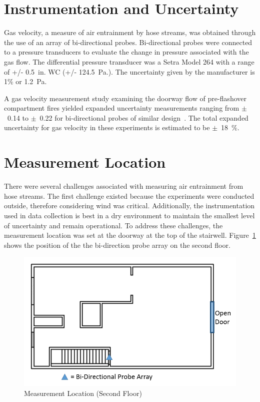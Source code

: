 \documentclass[12pt,oneside]{book}
\begin{document}
\section{Instrumentation and Uncertainty}
\label{sec:uncert}
Gas velocity, a measure of air entrainment by hose streams, was obtained through the use of an array of bi-directional probes. Bi-directional probes were connected to a pressure transducers to evaluate the change in pressure associated with the gas flow. The differential pressure transducer was a Setra Model 264 with a range of +/- 0.5~in. WC (+/- 124.5~Pa.). The uncertainty given by the manufacturer is 1\% or 1.2~Pa. 

A gas velocity measurement study examining the doorway flow of pre-flashover compartment fires yielded expanded uncertainty measurements ranging from $\pm$~0.14 to $\pm$~0.22 for bi-directional probes of similar design~\cite{Bryant:FSJ2009}. The total expanded uncertainty for gas velocity in these experiments is estimated to be $\pm$~18~\%.

\section{Measurement Location}
\label{sec:location}
There were several challenges associated with measuring air entrainment from hose streams. The first challenge existed because the experiments were conducted outside, therefore considering wind was critical. Additionally, the instrumentation used in data collection is best in a dry environment to maintain the smallest level of uncertainty and remain operational. To address these challenges, the measurement location was set at the doorway at the top of the stairwell. Figure~\ref{fig:Measurement_Location_Second_Floor} shows the position of the the bi-direction probe array on the second floor.

\begin{figure}[!ht]
	\centering
	\includegraphics[width=.7\columnwidth]{Figures/Air_Entrainment/Measurement_Locations_Secondfloor}
	\caption{Measurement Location (Second Floor)}
	\label{fig:Measurement_Location_Second_Floor}
\end{figure}
\end{document}
